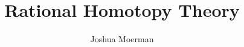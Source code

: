 \documentclass[a4paper, 11pt]{amsart}
\title{Rational Homotopy Theory}
\author{Joshua Moerman}
\begin{document}
\maketitle

 \newpage

\nocite{*}


\end{document}
